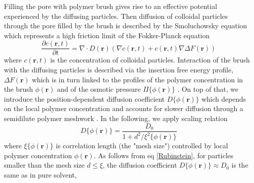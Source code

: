 \documentclass[12pt, a4paper]{article}
\begin{document}
 


Filling the pore with polymer brush gives rise to an  effective  potential experienced by the diffusing particles. 
Then diffusion of colloidal particles through the pore filled by the brush is described by the Smoluchowsky equation which represents 
a high friction limit of the Fokker-Planck equation \cite{Risken1996}
\begin{equation}
    \frac{\partial c(\textbf{r},t)}{\partial t}=\nabla\cdotp D(\textbf{r})\left(\nabla c(\textbf{r},t)+c(\textbf{r},t)\nabla\Delta F(\textbf{r})\right)
    \label{eq:smoluchowsky}
\end{equation}
where $c(\textbf{r},t)$ is the concentration of colloidal particles.
Interaction of the brush with the diffusing particles is described via the insertion free energy profile, $\Delta F(\textbf{r})$ which is in turn linked to the profiles 
of the polymer concentration in the brush $\phi(\textbf{r})$  and of the osmotic pressure $\Pi\{\phi(\textbf{r})\}$ \cite{Laktionov2023}. 
On top of that, we introduce the position-dependent diffusion coefficient $D\{\phi(\textbf{r})\}$
which depends on the local polymer concentration and accounts for slower diffusion through a semidilute polymer meshwork \cite{Laktionov2023}.
In the following, we apply scaling relation
\begin{equation}
    D\{\phi(\textbf{r})\} = \frac{D_{0}}{1+d^2/\xi^{2}\{\phi(\textbf{r})\}}
\label{Rubinstein}
\end{equation}
where $\xi\{\phi(\textbf{r})\}$ is correlation length (the "mesh size") controlled by local polymer concentration $\phi(\textbf{r})$. 
As follows from eq \ref{Rubinstein}, for particles smaller than the mesh size $d\leq \xi$, the diffusion coefficient $D\{\phi(\textbf{r})\}\approx D_0$ is the same as in pure solvent,
\end{document}
